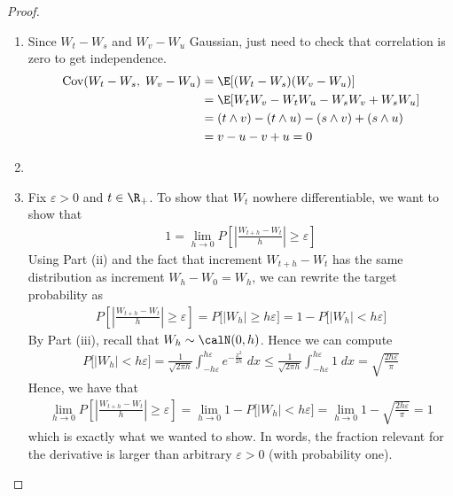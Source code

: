 \documentclass[12pt]{article}
\theoremstyle{plain}
\theoremstyle{definition}
\theoremstyle{remark}
\newcommand{\Cov}{\operatorname{Cov}}
\newcommand{\limh}{\lim_{h\rightarrow0}}
\begin{document}
\begin{proof}
\begin{enumerate}[label=(\roman*)]
  \item
    Since $W_t-W_s$ and $W_v-W_u$ Gaussian, just need to check that
    correlation is zero to get independence.
    \begin{align*}
      \Cov(W_t-W_s,\; W_v-W_u)
      &= \E[(W_t-W_s)(W_v-W_u)] \\
      &= \E[W_tW_v - W_tW_u - W_sW_v + W_sW_u] \\
      &= (t\wedge v) - (t\wedge u) - (s\wedge v) + (s\wedge u) \\
      &= v - u - v + u = 0
    \end{align*}
  \item
  \item
    Fix $\varepsilon>0$ and $t\in\R_+$.
    To show that $W_t$ nowhere differentiable, we want to show that
    \begin{align*}
      1=
      \limh
	    P\left[
        \left\lvert
        \frac{W_{t+h} - W_t}{h}
        \right\rvert \geq\varepsilon
      \right]
    \end{align*}
    Using Part (ii) and the fact that increment $W_{t+h}-W_t$ has the
    same distribution as increment $W_h-W_0=W_h$, we can rewrite
    the target probability as
    \begin{align*}
	    P\left[
        \left\lvert
        \frac{W_{t+h} - W_t}{h}
        \right\rvert \geq\varepsilon
      \right]
      =
	    P\big[
        \left\lvert
        W_{h}
        \right\rvert \geq h\varepsilon
      \big]
      =
      1-
      P\big[
        \left\lvert
        W_{h}
        \right\rvert < h\varepsilon
      \big]
    \end{align*}
    By Part (iii), recall that $W_h\sim\calN(0,h)$. Hence we can compute
    \begin{align*}
	    P\big[
        \left\lvert
        W_{h}
        \right\rvert < h\varepsilon
      \big]
      =
      \frac{1}{\sqrt{2\pi h}}
      \int_{-h\varepsilon}^{h\varepsilon}
	    e^{-\frac{x^2}{2h}} \;dx
      \leq
      \frac{1}{\sqrt{2\pi h}}
      \int_{-h\varepsilon}^{h\varepsilon}
	    1\;dx
      = \sqrt{\frac{2h\varepsilon}{\pi}}
    \end{align*}
    Hence, we have that
    \begin{align*}
      \limh
	    P\left[
        \left\lvert
        \frac{W_{t+h} - W_t}{h}
        \right\rvert \geq\varepsilon
      \right]
      =
      \limh 1-P\big[|W_h|<h\varepsilon\big]
      =\limh 1-\sqrt{\frac{2h\varepsilon}{\pi}}
      = 1
    \end{align*}
    which is exactly what we wanted to show.
    In words, the fraction relevant for the derivative is larger than
    arbitrary $\varepsilon>0$ (with probability one).

\end{enumerate}
\end{proof}
\end{document}
